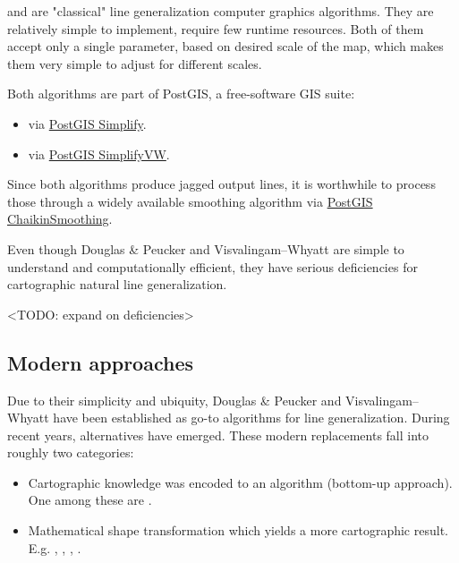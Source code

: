 \documentclass[a4paper]{article}
\newcommand{\DP}{Douglas \& Peucker}
\newcommand{\VW}{Visvalingam--Whyatt}
\begin{document}
\cite{douglas1973algorithms} and \cite{visvalingam1993line} are "classical"
line generalization computer graphics algorithms. They are relatively simple to
implement, require few runtime resources. Both of them accept only a single
parameter, based on desired scale of the map, which makes them very simple to
adjust for different scales.

Both algorithms are part of PostGIS, a free-software GIS suite:
\begin{itemize}
    \item \cite{douglas1973algorithms} via
        \href{https://postgis.net/docs/ST_Simplify.html}{PostGIS Simplify}.

    \item \cite{visvalingam1993line} via
        \href{https://postgis.net/docs/ST_SimplifyVW.html}{PostGIS SimplifyVW}.
\end{itemize}

Since both algorithms produce jagged output lines, it is worthwhile to process
those through a widely available \cite{chaikin1974algorithm} smoothing
algorithm via \href{https://postgis.net/docs/ST_ChaikinSmoothing.html}{PostGIS
ChaikinSmoothing}.

Even though {\DP} and {\VW} are simple to understand and computationally
efficient, they have serious deficiencies for cartographic natural line
generalization.

<TODO: expand on deficiencies>

\subsection{Modern approaches}

Due to their simplicity and ubiquity, {\DP} and {\VW} have been established as
go-to algorithms for line generalization. During recent years, alternatives
have emerged. These modern replacements fall into roughly two categories:

\begin{itemize}
    \item Cartographic knowledge was encoded to an algorithm (bottom-up
        approach). One among these are \cite{wang1998line}.
    \item Mathematical shape transformation which yields a more cartographic
        result. E.g. \cite{jiang2003line}, \cite{dyken2009simultaneous},
        \cite{mustafa2006dynamic}, \cite{nollenburg2008morphing}.
\end{itemize}
\end{document}
